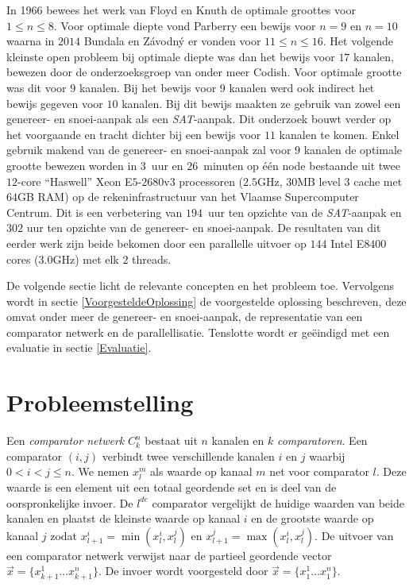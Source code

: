 \documentclass{article}
\begin{document}
In 1966 bewees het werk van Floyd en Knuth de optimale groottes voor $1 \leq n \leq 8$\cite{FloydKnuth}.
Voor optimale diepte vond Parberry een bewijs voor $n = 9$ en $n = 10$ waarna in $2014$ Bundala en Z\'avodn\'y er vonden voor $11 \leq n \leq 16$\cite{Parberry,BundalaZavodny}.
Het volgende kleinste open probleem bij optimale diepte was dan het bewijs voor $17$ kanalen, bewezen door de onderzoeksgroep van onder meer Codish\cite{CodishBackAgain}.
Voor optimale grootte was dit voor $9$ kanalen\cite{sortingNetworksSize2014}.
Bij het bewijs voor $9$ kanalen werd ook indirect het bewijs gegeven voor $10$ kanalen. 
Bij dit bewijs maakten ze gebruik van zowel een genereer- en snoei-aanpak als een \textit{SAT}-aanpak.
Dit onderzoek bouwt verder op het voorgaande en tracht dichter bij een bewijs voor $11$ kanalen te komen.
Enkel gebruik makend van de genereer- en snoei-aanpak zal voor $9$ kanalen de optimale grootte bewezen worden in $3$~uur en $26$~minuten op \'e\'en node bestaande uit twee $12$-core ``Haswell'' Xeon E$5$-$2680$v$3$ processoren ($2.5$GHz, $30$MB level $3$ cache met $64$GB RAM) op de rekeninfrastructuur van het Vlaamse Supercomputer Centrum.
Dit is een verbetering van $194$~uur ten opzichte van de \textit{SAT}-aanpak en $302$ uur ten opzichte van de genereer- en snoei-aanpak.
De resultaten van dit eerder werk zijn beide bekomen door een parallelle uitvoer op $144$ Intel E$8400$ cores ($3.0$GHz) met elk $2$ threads.

De volgende sectie licht de relevante concepten en het probleem toe.
Vervolgens wordt in sectie \ref{VoorgesteldeOplossing} de voorgestelde oplossing beschreven, deze omvat onder meer de genereer- en snoei-aanpak, de representatie van een comparator netwerk en de parallellisatie.
Tenslotte wordt er ge\"eindigd met een evaluatie in sectie \ref{Evaluatie}.

\section{Probleemstelling}
Een \textit{comparator netwerk} $C^n_k$ bestaat uit $n$ kanalen en $k$ \textit{comparatoren}.
Een comparator $\left(i, j\right)$ verbindt twee verschillende kanalen $i$ en $j$ waarbij $0 < i < j \leq n$.
We nemen $x_l^m$ als waarde op kanaal $m$ net voor comparator $l$.
Deze waarde is een element uit een totaal geordende set en is deel van de oorspronkelijke invoer. 
De $l^{de}$ comparator  vergelijkt de huidige waarden van beide kanalen en plaatst de kleinste waarde op kanaal $i$ en de grootste waarde op kanaal $j$ zodat $x_{l+1}^i = \min(x_l^i,x_l^j)$ en $x_{l+1}^j = \max(x_l^i,x_l^j)$.
De uitvoer van een comparator netwerk verwijst naar de partieel geordende vector $\vec{x} = \{x^1_{k+1} \dots x^n_{k+1} \} $.
De invoer wordt voorgesteld door $\vec{x} = \{x^1_{1} \dots x^n_{1} \} $. 
\end{document}
